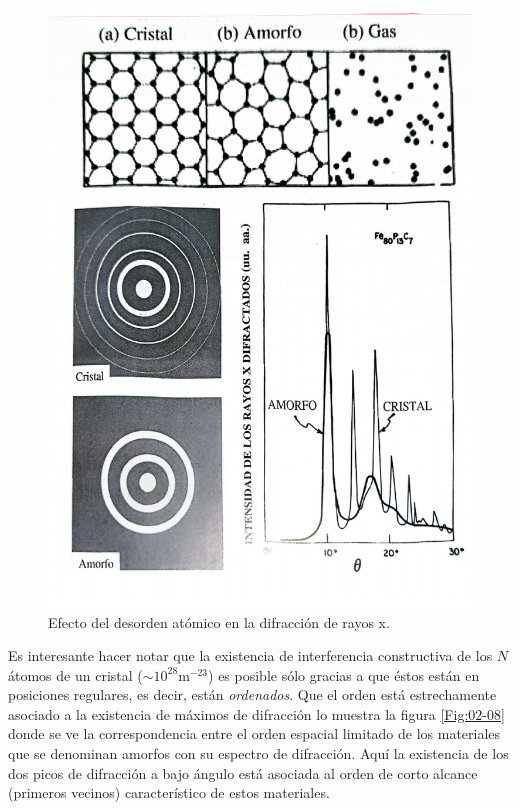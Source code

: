 \begin{figure}[h!] \centering
    \includegraphics[scale=0.45]{Cuerpo/Ch_02/Fotos_libro 9.pdf}
    \caption{Efecto del desorden atómico en la difracción de rayos x.}
    \label{Fig:02-09}
\end{figure}

Es interesante hacer notar que la existencia de interferencia constructiva de los $N$ átomos de un cristal ($\sim 10^{28} \text{m}^{-23}$) es posible sólo gracias a que éstos están en posiciones regulares, es decir, están \textit{ordenados}. Que el orden está estrechamente asociado a la existencia de máximos de difracción lo muestra la figura \ref{Fig:02-08} donde se ve la correspondencia entre el orden espacial limitado de los materiales que se denominan amorfos con su espectro de difracción. Aquí la existencia de los dos picos de difracción a bajo ángulo está asociada al orden de corto alcance (primeros vecinos) característico de estos materiales.












